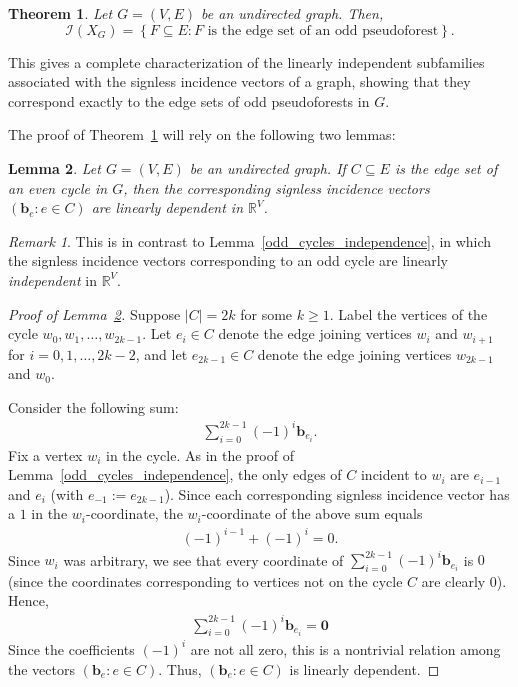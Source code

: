 \documentclass[12pt]{article}
\newtheorem{theorem}{Theorem}[section]
\newtheorem{lemma}[theorem]{Lemma}
\theoremstyle{definition}
\theoremstyle{remark}
\newtheorem*{remark}{Remark}
\newcommand{\set}[1]{\left\{ #1 \right\}}
\newcommand{\tup}[1]{\left( #1 \right)}
\begin{document}
\begin{theorem}\label{I=pseduo}
    Let $G=(V,E)$ be an undirected graph. Then,
    \[\mathcal{I}(X_G) = \set{F \subseteq E : F \text{ is the edge set of an odd pseudoforest}}.\]
\end{theorem}

This gives a complete characterization of the linearly independent subfamilies associated with the signless incidence vectors of a graph, showing that they correspond exactly to the edge sets of odd pseudoforests in $G$.

The proof of Theorem~\ref{I=pseduo} will rely on the following two lemmas:

\begin{lemma}\label{even_cycles_dependence}
    Let $G=(V,E)$ be an undirected graph. If $C \subseteq E$ is the edge set of an even cycle in $G$, then the corresponding signless incidence vectors $\tup{\mathbf{b}_e : e \in C}$ are linearly dependent  in $\mathbb{R}^V$.
\end{lemma}

\begin{remark}
    This is in contrast to Lemma~\ref{odd_cycles_independence}, in which the signless incidence vectors corresponding to an odd cycle are linearly \textit{independent} in $\mathbb{R}^{V}$.
\end{remark}

\begin{proof}[Proof of Lemma~\ref{even_cycles_dependence}]
    Suppose $|C|=2k$ for some $k \geq 1$. Label the vertices of the cycle $w_0,w_1,\ldots,w_{2k-1}$. Let $e_i \in C$ denote the edge joining vertices $w_i$ and $w_{i+1}$ for $i=0,1,\ldots,2k-2$, and let $e_{2k-1} \in C$ denote the edge joining vertices $w_{2k-1}$ and $w_0$.

    Consider the following sum: \begin{align*}
        \sum_{i=0}^{2k-1}\tup{-1}^{i}\mathbf{b}_{e_i}.
    \end{align*} Fix a vertex $w_i$ in the cycle. As in the proof of Lemma~\ref{odd_cycles_independence}, the only edges of $C$ incident to $w_i$ are $e_{i-1}$ and $e_i$ (with $e_{-1} :=e_{2k-1}$). Since each corresponding signless incidence vector has a $1$ in the $w_i$-coordinate, the $w_i$-coordinate of the above sum equals \begin{align*}
        (-1)^{i-1}+(-1)^i = 0.
    \end{align*} Since $w_i$ was arbitrary, we see that every coordinate of $\sum_{i=0}^{2k-1}(-1)^{i}\mathbf{b}_{e_i}$ is $0$ (since the coordinates corresponding to vertices not on the cycle $C$ are clearly $0$). Hence, \begin{align*}
        \sum_{i=0}^{2k-1}(-1)^{i}\mathbf{b}_{e_i} = \mathbf{0}
    \end{align*} Since the coefficients $\tup{-1}^i$ are not all zero, this is a nontrivial relation among the vectors $\tup{\mathbf{b}_e : e \in C}$. Thus, $\tup{\mathbf{b}_e : e \in C}$ is linearly dependent.
\end{proof}
\end{document}
